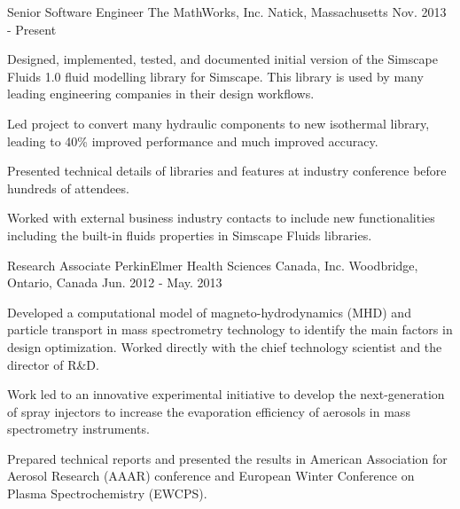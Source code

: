 


\begin{cventries}


\cventry
{Senior Software Engineer} %
{The MathWorks, Inc.} %
{Natick, Massachusetts} %
{Nov. 2013 - Present} %
{ %
\begin{cvitems}
\item {Designed, implemented, tested, and documented initial version of the Simscape Fluids 1.0 fluid modelling library for Simscape. This library is used by many leading engineering companies in their design workflows.}
\item {Led project to convert many hydraulic components to new isothermal library, leading to 40\% improved performance and much improved accuracy.}
\item {Presented technical details of libraries and features at industry conference before hundreds of attendees.}
\item{Worked with external business industry contacts to include new functionalities including the built-in fluids properties in Simscape Fluids libraries.\\}
\end{cvitems}
}


\cventry
{Research Associate} %
{PerkinElmer Health Sciences Canada, Inc.} %
{Woodbridge, Ontario, Canada} %
{Jun. 2012 - May. 2013} %
{ %
\begin{cvitems}
\item {Developed a computational model of magneto-hydrodynamics (MHD) and particle transport in mass spectrometry technology to identify the main factors in design optimization. Worked directly with the chief technology scientist and the director of R\&D.}
\item {Work led to an innovative experimental initiative to develop the next-generation of spray injectors
to increase the evaporation efficiency of aerosols in mass spectrometry instruments.}
\item{Prepared technical reports and presented the results in American Association for Aerosol Research (AAAR) conference and European Winter Conference on Plasma Spectrochemistry (EWCPS).\\}
\end{cvitems}
}


\end{cventries}
